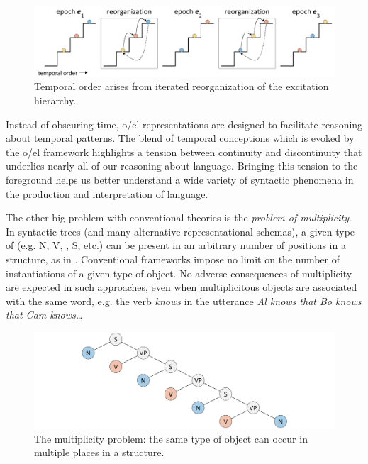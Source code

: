   
\begin{figure}
\includegraphics[width=\textwidth]{figures/Tilsen-img6.png}
\caption{Temporal order arises from iterated reorganization of the excitation hierarchy.}
\label{fig:1:6}
\end{figure}
 

  Instead of obscuring time, o/el representations are designed to facilitate reasoning about temporal patterns. The blend of temporal conceptions which is evoked by the o/el framework highlights a tension between continuity and discontinuity that underlies nearly all of our reasoning about language. Bringing this tension to the foreground helps us better understand a wide variety of syntactic phenomena in the production and interpretation of language.

The other big problem with conventional theories is the \textit{problem of multiplicity}. In syntactic trees (and many alternative representational schemas), a given type of  (e.g. N, V, , S, etc.) can be present in an arbitrary number of positions in a structure, as in {}. Conventional frameworks impose no limit on the number of instantiations of a given type of object. No adverse consequences of multiplicity are expected in such approaches, even when multiplicitous objects are associated with the same word, e.g. the verb \textit{knows} in the utterance \textit{Al knows that Bo knows that Cam knows…}  

  
\begin{figure}
\includegraphics[width=\textwidth]{figures/Tilsen-img7.png}
\caption{The multiplicity problem: the same type of object can occur in multiple places in a structure.}
\label{fig:1:7}
\end{figure}
 

